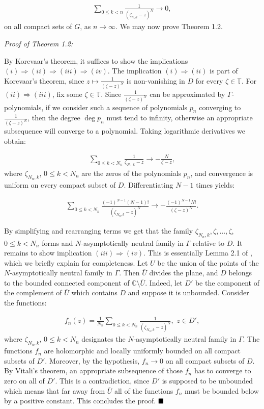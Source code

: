 \documentclass{amsart}[11pt]
\newcommand{\C}{\mathbb{C}} %
\newcommand{\T}{\mathbb{T}} %
\newcommand{\Ra}{\Rightarrow}
\newcommand{\ra}{\rightarrow}
\theoremstyle{definition}
\begin{document}
\begin{gather*}
\sum_{0 \leq k < n} \frac{1}{(\zeta_{n,k}-z)^N} \ra 0,
\end{gather*}
on all compact sets of $G$, as $n \ra \infty$. We may now prove Theorem 1.2.

\vspace{2mm}

\textit{Proof of Theorem 1.2:}

By Korevaar's theorem, it suffices to show the implications $(i) \Ra (ii) \Ra (iii) \Ra (iv)$. The implication $(i) \Ra (ii) $ is part of Korevaar's theorem, since $z \mapsto \frac{1}{(\zeta - z)^N}$ is non-vanishing in $D$ for every $\zeta \in \T$. For $(ii) \Ra (iii) $, fix some $\zeta \in \T$. Since $\frac{1}{(\zeta - z)^N}$ can be approximated by $\Gamma$-polynomials, if we consider such a sequence of polynomials $p_n$ converging to $\frac{1}{(\zeta - z)^N}$, then the degree $\deg p_n$ must tend to infinity, otherwise an appropriate subsequence will converge to a polynomial. Taking logarithmic derivatives we obtain:

\begin{gather*}
    \sum_{0 \leq k < N_n} \frac{1}{\zeta_{N_n,k}-z} \ra -\frac{N}{\zeta - z},
\end{gather*}
where $\zeta_{N_n,k}$, $0 \leq k < N_n$ are the zeros of the polynomials $p_n$, and convergence is uniform on every compact subset of $D$. Differentiating $N-1$ times yields:

\begin{gather*}
    \sum_{0 \leq k < N_n} \frac{(-1)^{N-1}(N-1)!}{(\zeta_{N_n,k}-z)^N} \ra -\frac{(-1)^{N-1}N!}{(\zeta - z)^N}.
\end{gather*}


By simplifying and rearranging terms we get that the family $\zeta_{N_n,k}, \zeta, \ldots, \zeta$, $0 \leq k < N_n$ forms and $N$-asymptotically neutral family in $\Gamma$ relative to $D$. It remains to show implication $(iii) \Rightarrow (iv)$. This is essentially Lemma 2.1 of \cite{Korevaar1964}, which we briefly explain for completeness. Let $U$ be the union of the points of the $N$-asymptotically neutral family in $\Gamma$. Then $\overline{U}$ divides the plane, and $D$ belongs to the bounded connected component of $\C \setminus \overline{U}$. Indeed, let $D'$ be the component of the complement of $\overline{U}$ which contains $D$ and suppose it is unbounded. Consider the functions:

\begin{gather*}
    f_n(z) = \frac{1}{N_n} \sum_{0 \leq k < N_n} \frac{1}{(\zeta_{N_n,k}-z)^N}, \,\, z \in D',
\end{gather*}
where $\zeta_{N_n,k}$, $0 \leq k < N_n$ designates the $N$-asymptotically neutral family in $\Gamma$. The functions $f_n$ are holomorphic and locally uniformly bounded on all compact subsets of $D'$. Moreover, by the hypothesis, $f_n \ra 0$ on all compact subsets of $D$. By Vitali's theorem, an appropriate subsequence of those $f_n$ has to converge to zero on all of $D'$. This is a contradiction, since $D'$ is supposed to be unbounded which means that far away from $\overline{U}$ all of the functions $f_n$ must be bounded below by a positive constant. This concludes the proof.
$\hfill \blacksquare$
\end{document}
